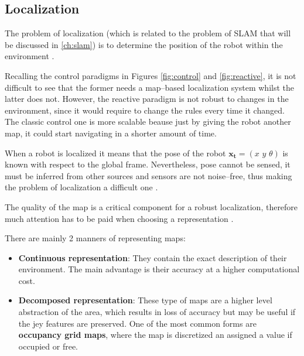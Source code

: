 \subsection{Localization} \label{sub:localization}

The problem of localization (which is related to the problem of SLAM that will be discussed in \autoref{ch:slam}) is to determine the position of the robot within the environment .

Recalling the control paradigms in Figures \ref{fig:control} and \ref{fig:reactive}, it is not difficult to see that the former needs a map--based localization system whilst the latter does not. However, the reactive paradigm is not robust to changes in the environment, since it would require to change the rules every time it changed. The classic control one is more scalable beause just by giving the robot another map, it could start navigating in a shorter amount of time.

When a robot is localized it means that the pose of the robot $\mathbf{x_t} = (x\,\, y\,\, \theta)$ is known with respect to the global frame. Nevertheless, pose cannot be sensed, it must be inferred from other sources and sensors are not noise--free, thus making the problem of localization a difficult one .

\newpage
{} The quality of the map is a critical component for a robust localization, therefore much attention has to be paid when choosing a representation .

There are mainly 2 manners of representing maps:
\begin{itemize}
  \item \textbf{Continuous representation}: They contain the exact description of their environment. The main advantage is their accuracy at a higher computational cost.
  
  \item \textbf{Decomposed representation}: These type of maps are a higher level abstraction of the area, which results in loss of accuracy but may be useful if the jey features are preserved. One of the most common forms are \textbf{occupancy grid maps}, where the map is discretized an assigned a value if occupied or free.
\end{itemize}  

